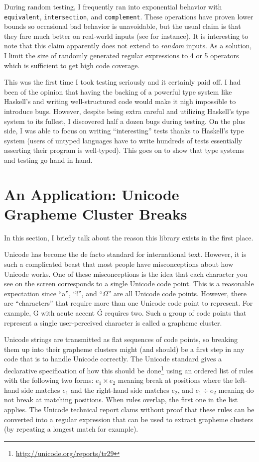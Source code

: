 \documentclass[11pt]{article}
\newcommand{\haskell}{\lstinline}
\begin{document}
During random testing, I frequently ran into exponential behavior with \haskell{equivalent}, \haskell{intersection}, and \haskell{complement}. These operations have proven lower bounds \cite{Kozen77,GeladeN12} so occasional bad behavior is unavoidable, but the usual claim is that they fare much better on real-world inputs (see \cite{FosterKM0T15} for instance). It is interesting to note that this claim apparently does not extend to \emph{random} inputs. As a solution, I limit the size of randomly generated regular expressions to 4 or 5 operators which is sufficient to get high code coverage.

This was the first time I took testing seriously and it certainly paid off. I had been of the opinion that having the backing of a powerful type system like Haskell's and writing well-structured code would make it nigh impossible to introduce bugs. However, despite being extra careful and utilizing Haskell's type system to its fullest, I discovered half a dozen bugs during testing. On the plus side, I was able to focus on writing ``interesting'' tests thanks to Haskell's type system (users of untyped languages have to write hundreds of tests essentially asserting their program is well-typed). This goes on to show that type systems and testing go hand in hand.

\section{An Application: Unicode Grapheme Cluster Breaks}\label{application}

In this section, I briefly talk about the reason this library exists in the first place.

Unicode has become the de facto standard for international text. However, it is such a complicated beast that most people have misconceptions about how Unicode works. One of these misconceptions is the idea that each character you see on the screen corresponds to a single Unicode code point. This is a reasonable expectation since ``a'', ``!'', and ``$\Omega$'' are all Unicode code points. However, there are ``characters'' that require more than one Unicode code point to represent. For example, G with acute accent \'G requires two. Such a group of code points that represent a single user-perceived character is called a grapheme cluster.

Unicode strings are transmitted as flat sequences of code points, so breaking them up into their grapheme clusters might (and should) be a first step in any code that is to handle Unicode correctly. The Unicode standard gives a declarative specification of how this should be done\footnote{\url{http://unicode.org/reports/tr29}} using an ordered list of rules with the following two forms: $e_1 \times e_2$ meaning break at positions where the left-hand side matches $e_1$ and the right-hand side matches $e_2$, and $e_1 \div e_2$ meaning do not break at matching positions. When rules overlap, the first one in the list applies. The Unicode technical report clams without proof that these rules can be converted into a regular expression that can be used to extract grapheme clusters (by repeating a longest match for example).
\end{document}
